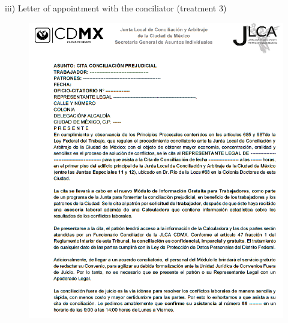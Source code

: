 iii) Letter of appointment with the conciliator (treatment 3)
\begin{figure}[H] 
    \centering
    \includegraphics[width=1\textwidth]{Figures/A2_letter_ES.PNG}
    \label{fig:A2_4_1}
\end{figure}
